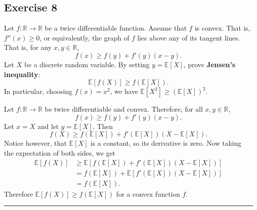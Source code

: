 \documentclass{article}
\theoremstyle{break}
\renewenvironment{proof}{{\bf Proof:}}{\hfill\rule{2mm}{2mm}}
\newcommand{\E}{\mathbb{E}}
\newcommand{\R}{\mathbb{R}}
\begin{document}
\subsection*{Exercise 8}
Let $f: \R \rightarrow \R$ be a twice differentiable function. Assume that $f$ is convex. That is, $f''(x) \geq 0$, or equivalently, the graph of $f$ lies above any of its tangent lines. That is, for any $x, y \in \R$,
\[ f(x) \geq f(y) + f'(y)(x-y).\]
Let $X$ be a discrete random variable. By setting $y = \E[X]$, prove \textbf{Jensen's inequality}:
\[\E[f(X)] \geq f(\E[X]).\]
In particular, choosing $f(x) = x^2$, we have $\E[X^2] \geq (\E[X])^2$.

\begin{proof}
Let $f: \R \rightarrow \R$ be twice differentiable and convex. Therefore, for all $x, y \in \R$,
\[ f(x) \geq f(y) + f'(y)(x-y).\]
Let $x = X$ and let $y = \E[X]$. Then 
\[ f(X) \geq f(\E[X]) + f'(\E[X]) (X - \E[X]).\]
Notice however, that $\E[X]$ is a constant, so its derivative is zero. Now taking the expectation of both sides, we get 
\begin{align*}
\E[f(X)] &\geq \E[  f(\E[X]) + f'(\E[X]) (X - \E[X]) ] \\
	&= f(\E[X]) + \E[ f'(\E[X]) (X - \E[X]) ] \\
	&= f(\E[X]).
\end{align*}
Therefore $\E[f(X)] \geq f(\E[X])$ for a convex function $f$.
\end{proof}
\end{document}
